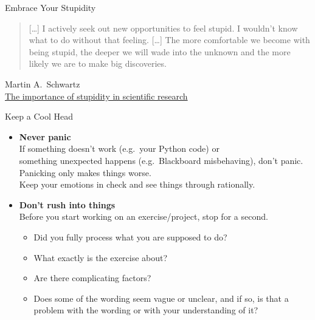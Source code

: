 \documentclass[professionalfonts, xcolor={usenames,svgnames,x11names,table}]{beamer}
\begin{document}
\begin{frame}{Embrace Your Stupidity}
    \begin{quotation}
        [\ldots]
        I actively seek out new opportunities to feel stupid.
        I wouldn't know what to do without that feeling.
        [\ldots]
        The more comfortable we become with being stupid, the deeper we will wade into the unknown and the more likely we are to make big discoveries.
    \end{quotation}
    \begin{flushright}
        Martin A.\ Schwartz\\
        \href{http://jcs.biologists.org/content/121/11/1771}{The importance of stupidity in scientific research}
    \end{flushright}
\end{frame}

\begin{frame}{Keep a Cool Head}
    \begin{itemize}
        \item \textbf{Never panic}\\
            If something doesn't work (e.g.\ your Python code) or\\
            something unexpected happens (e.g.\ Blackboard misbehaving),
            don't panic.
            Panicking only makes things worse.\\
            Keep your emotions in check and see things through rationally.

        \item \textbf{Don't rush into things}\\
            Before you start working on an exercise\slash project, stop for a second.
            \begin{itemize}
              \item Did you fully process what you are supposed to do?
              \item What exactly is the exercise about?
              \item Are there complicating factors?
              \item Does some of the wording seem vague or unclear, and if so, is that a problem with the wording or with your understanding of it?
            \end{itemize}
    \end{itemize}
\end{frame}
\end{document}
